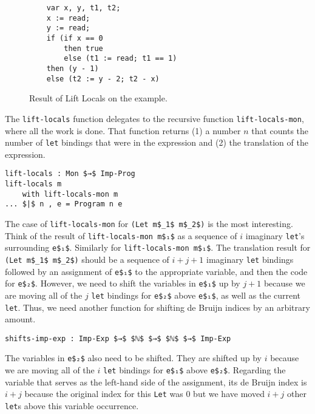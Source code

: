 \documentclass[sigplan,screen]{acmart}
\begin{document}
\begin{figure}[tp]
\begin{lstlisting}
    var x, y, t1, t2;
    x := read;
    y := read;
    if (if x == 0
        then true
        else (t1 := read; t1 == 1)
    then (y - 1)
    else (t2 := y - 2; t2 - x)
\end{lstlisting}
  \caption{Result of Lift Locals on the example.}
  \label{fig:running-example-structured-imperative}
\end{figure}
The \lstinline{lift-locals} function delegates to the recursive
function \lstinline{lift-locals-mon}, where all the work is done.
That function returns (1) a number $n$ that counts the number of
\lstinline{let} bindings that were in the expression and (2) the
translation of the expression.

\begin{lstlisting}
lift-locals : Mon $→$ Imp-Prog
lift-locals m
    with lift-locals-mon m
... $|$ n , e = Program n e    
\end{lstlisting}

\noindent The case of \lstinline{lift-locals-mon} for \lstinline{(Let m$_1$ m$_2$)}
is the most interesting. Think of the result of
\lstinline{lift-locals-mon m$₁$} as a sequence of $i$ imaginary
\lstinline{let}'s surrounding \lstinline{e$₁$}. Similarly for
\lstinline{lift-locals-mon m$₁$}.  The translation result for
\lstinline{(Let m$_1$ m$_2$)} should be a sequence of $i + j + 1$ imaginary
\lstinline{let} bindings followed by an assignment of \lstinline{e$₁$} to
the appropriate variable, and then the code for
\lstinline{e$₂$}. However, we need to shift the variables in
\lstinline{e$₁$} up by $j + 1$ because we are moving all of the $j$
\lstinline{let} bindings for \lstinline{e$₂$} above \lstinline{e$₁$}, as well
as the current \lstinline{let}. Thus, we need another function for
shifting de Bruijn indices by an arbitrary amount.

\begin{lstlisting}
shifts-imp-exp : Imp-Exp $→$ $ℕ$ $→$ $ℕ$ $→$ Imp-Exp
\end{lstlisting}

The variables in \lstinline{e$₂$} also need to be shifted.  They are
shifted up by $i$ because we are moving all of the $i$
\lstinline{let} bindings for \lstinline{e$₁$} above
\lstinline{e$₂$}. Regarding the variable that serves as the left-hand
side of the assignment, its de Bruijn index is $i + j$ because the
original index for this \lstinline{Let} was $0$ but we have moved $i +
j$ other \lstinline{let}s above this variable occurrence.
\end{document}
